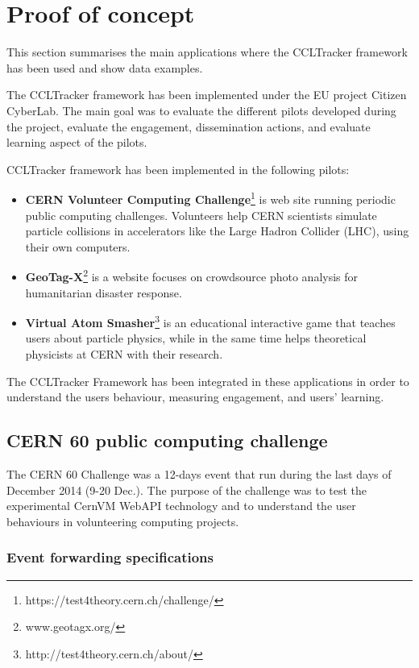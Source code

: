 \documentclass{article}
\begin{document}
\section{Proof of concept}

This section summarises the main applications where the CCLTracker framework has been used and show data examples. 

The CCLTracker framework has been implemented under the EU project Citizen CyberLab. The main goal was to evaluate the different pilots developed during the project, evaluate the engagement, dissemination actions, and evaluate learning aspect of the pilots.

CCLTracker framework has been implemented in the following pilots:

\begin{itemize}
\item \textbf{CERN Volunteer Computing Challenge}\footnote{https://test4theory.cern.ch/challenge/} is  web site running periodic public computing challenges. Volunteers help CERN scientists simulate particle collisions in accelerators like the Large Hadron Collider (LHC), using their own computers.

\item \textbf{GeoTag-X}\footnote{www.geotagx.org/} is a website focuses on crowdsource photo analysis for humanitarian disaster response.

\item \textbf{Virtual Atom Smasher}\footnote{http://test4theory.cern.ch/about/} is an educational interactive game that teaches users about particle physics, while in the same time helps theoretical physicists at CERN with their research.
\end{itemize}


The CCLTracker Framework has been integrated in these applications in order to understand the users behaviour, measuring engagement, and users' learning. 


\subsection{CERN 60 public computing challenge}

The CERN 60 Challenge was a 12-days event that run during the last days of December 2014 (9-20 Dec.). The purpose of the challenge was to test the experimental CernVM WebAPI technology and to understand the user behaviours in volunteering computing projects.

\subsubsection{Event forwarding specifications}
\end{document}
